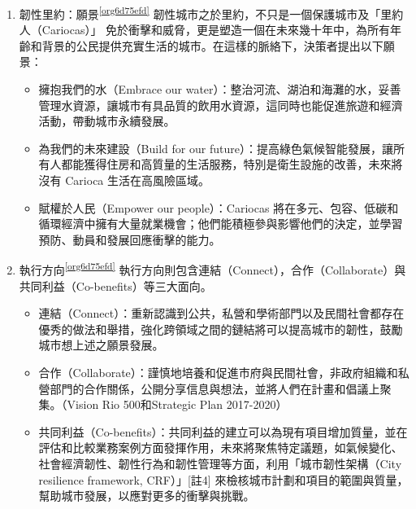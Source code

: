 \documentclass[a4paper,12pt]{article}
\begin{document}
\begin{enumerate}
\item 韌性里約：願景\textsuperscript{\ref{org6d75efd}}
\label{sec:org5011ed6}
韌性城市之於里約，不只是一個保護城市及「里約人（Cariocas）」 免於衝擊和威脅，更是塑造一個在未來幾十年中，為所有年齡和背景的公民提供充實生活的城市。在這樣的脈絡下，決策者提出以下願景：\\
\begin{itemize}
\item 擁抱我們的水（Embrace our water）：整治河流、湖泊和海灘的水，妥善管理水資源，讓城市有具品質的飲用水資源，這同時也能促進旅遊和經濟活動，帶動城市永續發展。\\
\item 為我們的未來建設（Build for our future）：提高綠色氣候智能發展，讓所有人都能獲得住房和高質量的生活服務，特別是衛生設施的改善，未來將沒有 Carioca 生活在高風險區域。\\
\item 賦權於人民（Empower our people）：Cariocas 將在多元、包容、低碳和循環經濟中擁有大量就業機會；他們能積極參與影響他們的決定，並學習預防、動員和發展回應衝擊的能力。\\
\end{itemize}

\item 執行方向\textsuperscript{\ref{org6d75efd}}
\label{sec:orgc6a823b}
執行方向則包含連結（Connect），合作（Collaborate）與共同利益（Co-benefits）等三大面向。\\
\begin{itemize}
\item 連結（Connect）：重新認識到公共，私營和學術部門以及民間社會都存在優秀的做法和舉措，強化跨領域之間的鏈結將可以提高城市的韌性，鼓勵城市想上述之願景發展。\\
\item 合作（Collaborate）：謹慎地培養和促進市府與民間社會，非政府組織和私營部門的合作關係，公開分享信息與想法，並將人們在計畫和倡議上聚集。（Vision Rio 500和Strategic Plan 2017-2020）\\
\item 共同利益（Co-benefits）：共同利益的建立可以為現有項目增加質量，並在評估和比較業務案例方面發揮作用，未來將聚焦特定議題，如氣候變化、社會經濟韌性、韌性行為和韌性管理等方面，利用「城市韌性架構（City resilience framework, CRF）」[註4] 來檢核城市計劃和項目的範圍與質量，幫助城市發展，以應對更多的衝擊與挑戰。\\
\end{itemize}


\end{enumerate}
\end{document}
